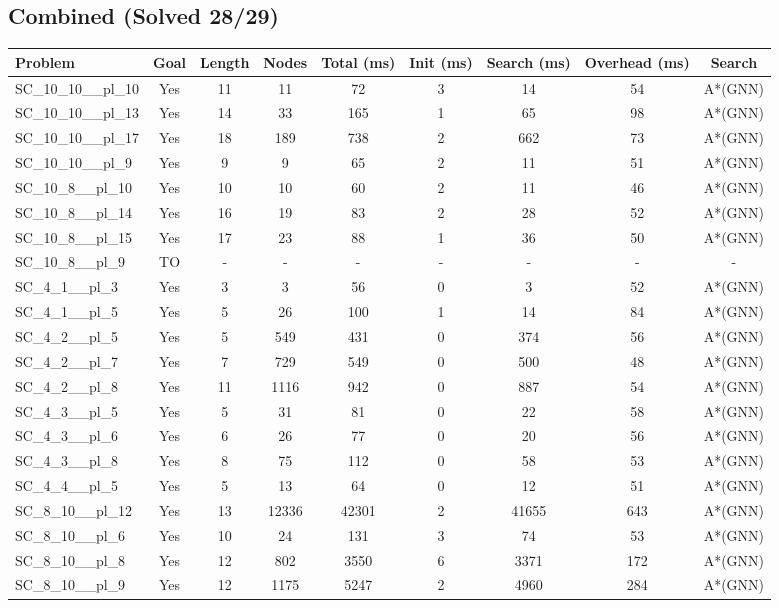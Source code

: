 \documentclass{article}
\begin{document}
\subsection*{Combined (Solved 28/29)}
\begin{tabular}{lcccccccc}
\toprule
Problem & Goal & Length & Nodes & Total (ms) & Init (ms) & Search (ms) & Overhead (ms) & Search \\
\midrule
SC\_10\_10\_\_pl\_10 & Yes & 11 & 11 & 72 & 3 & 14 & 54 & A*(GNN) \\
SC\_10\_10\_\_pl\_13 & Yes & 14 & 33 & 165 & 1 & 65 & 98 & A*(GNN) \\
SC\_10\_10\_\_pl\_17 & Yes & 18 & 189 & 738 & 2 & 662 & 73 & A*(GNN) \\
SC\_10\_10\_\_pl\_9 & Yes & 9 & 9 & 65 & 2 & 11 & 51 & A*(GNN) \\
SC\_10\_8\_\_pl\_10 & Yes & 10 & 10 & 60 & 2 & 11 & 46 & A*(GNN) \\
SC\_10\_8\_\_pl\_14 & Yes & 16 & 19 & 83 & 2 & 28 & 52 & A*(GNN) \\
SC\_10\_8\_\_pl\_15 & Yes & 17 & 23 & 88 & 1 & 36 & 50 & A*(GNN) \\
SC\_10\_8\_\_pl\_9 & TO & - & - & - & - & - & - & - \\
SC\_4\_1\_\_pl\_3 & Yes & 3 & 3 & 56 & 0 & 3 & 52 & A*(GNN) \\
SC\_4\_1\_\_pl\_5 & Yes & 5 & 26 & 100 & 1 & 14 & 84 & A*(GNN) \\
SC\_4\_2\_\_pl\_5 & Yes & 5 & 549 & 431 & 0 & 374 & 56 & A*(GNN) \\
SC\_4\_2\_\_pl\_7 & Yes & 7 & 729 & 549 & 0 & 500 & 48 & A*(GNN) \\
SC\_4\_2\_\_pl\_8 & Yes & 11 & 1116 & 942 & 0 & 887 & 54 & A*(GNN) \\
SC\_4\_3\_\_pl\_5 & Yes & 5 & 31 & 81 & 0 & 22 & 58 & A*(GNN) \\
SC\_4\_3\_\_pl\_6 & Yes & 6 & 26 & 77 & 0 & 20 & 56 & A*(GNN) \\
SC\_4\_3\_\_pl\_8 & Yes & 8 & 75 & 112 & 0 & 58 & 53 & A*(GNN) \\
SC\_4\_4\_\_pl\_5 & Yes & 5 & 13 & 64 & 0 & 12 & 51 & A*(GNN) \\
SC\_8\_10\_\_pl\_12 & Yes & 13 & 12336 & 42301 & 2 & 41655 & 643 & A*(GNN) \\
SC\_8\_10\_\_pl\_6 & Yes & 10 & 24 & 131 & 3 & 74 & 53 & A*(GNN) \\
SC\_8\_10\_\_pl\_8 & Yes & 12 & 802 & 3550 & 6 & 3371 & 172 & A*(GNN) \\
SC\_8\_10\_\_pl\_9 & Yes & 12 & 1175 & 5247 & 2 & 4960 & 284 & A*(GNN) \\

\end{tabular}
\end{document}
